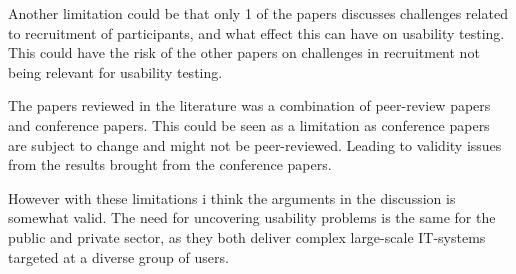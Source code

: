 Another limitation could be that only 1 of the papers discusses challenges related to recruitment of participants, and what effect this can have on usability testing. This could have the risk of the other papers on challenges in recruitment not being relevant for usability testing.

The papers reviewed in the literature was a combination of peer-review papers and conference papers. This could be seen as a limitation as conference papers are subject to change and might not be peer-reviewed. Leading to validity issues from the results brought from the conference papers.

However with these limitations i think the arguments in the discussion is somewhat valid. The need for uncovering usability problems is the same for the public and private sector, as they both deliver complex large-scale IT-systems targeted at a diverse group of users.